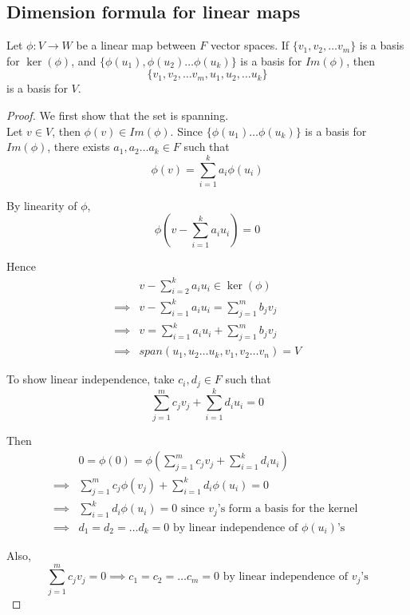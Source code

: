 \subsection{Dimension formula for linear maps}

\begin{theorem}
    Let $\phi: V \to W$ be a linear map between $F$ vector spaces. If $ \{ v_1, v_2, \hdots v_m \} $ is a basis for $\ker(\phi)$, and $ \{ \phi(u_1), \phi(u_2) \hdots \phi(u_k) \} $ is a basis for $Im(\phi)$, then 
    \[
        \{ v_1, v_2, \hdots v_m, u_1, u_2, \hdots u_k \} 
    \]
    is a basis for $V$. 
\end{theorem}

\begin{proof}

    We first show that the set is spanning.  \\

    Let $v \in V$, then $\phi(v) \in Im(\phi)$. Since $ \{ \phi(u_1) \hdots \phi(u_k) \} $ is a basis for $Im(\phi)$, there exists $a_1, a_2 \hdots a_k \in F$ such that 
    \[
        \phi(v) = \sum\limits_{i = 1}^{k} a_i \phi(u_i)
    \]

    By linearity of $\phi$, 
    \[
        \phi \left( v - \sum\limits_{i =1}^{k} a_i u_i \right)  = 0
    \]

    Hence 
    \begin{align*}
        & v - \sum\limits_{i = 2}^{k} a_i u_i \in \ker(\phi) \\
        \implies & v - \sum\limits_{i = 1}^{k} a_i u_i = \sum\limits_{j=1}^{m} b_j v_j \\
        \implies & v = \sum\limits_{i = 1}^{k} a_i u_i + \sum\limits_{j = 1}^{m} b_j v_j \\
        \implies & span \left( u_1, u_2 \hdots u_k, v_1, v_2 \hdots v_n \right)  = V
    \end{align*} 

    To show linear independence, take $c_i, d_j \in F$ such that 
    \[
        \sum\limits_{j = 1}^{m} c_j v_j + \sum\limits_{i = 1}^{k} d_i u_i = 0
    \]

    Then 
    \begin{align*}
        & 0 = \phi(0) = \phi \left( \sum\limits_{ j = 1}^{m} c_j v_j + \sum\limits_{i = 1}^{k} d_i u_i \right)  \\
        \implies & \sum\limits_{ j = 1}^{m} c_j \phi(v_j) + \sum\limits_{i = 1}^{k} d_i \phi(u_i) = 0 \\
        \implies & \sum\limits_{ i = 1}^{k} d_i \phi(u_i) = 0 \text{ since $v_j$'s form a basis for the kernel }\\
        \implies & d_1 = d_2 = \hdots d_k = 0 \text{ by linear independence of $\phi(u_i)$'s}
    \end{align*}

    Also, 
    \[
        \sum\limits_{ j = 1}^{m} c_j v_j = 0 \implies c_1 = c_2 = \hdots c_m = 0 \text{ by linear independence of $v_j$'s}
    \]
\end{proof}

